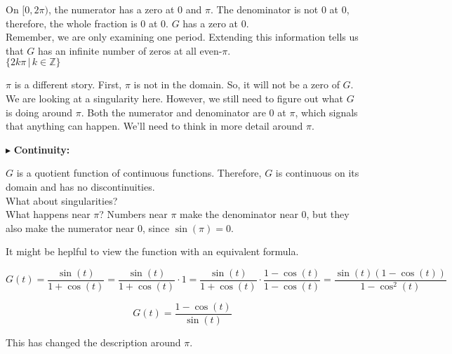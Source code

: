 \documentclass{ximera}
\begin{document}
On $[0, 2\pi)$, the numerator has a zero at $0$ and $\pi$.   The denominator is not $0$ at $0$, therefore, the whole fraction is $0$ at $0$.  $G$ has a zero at $0$. \\

Remember, we are only examining one period.  Extending this information tells us that $G$ has an infinite number of zeros at all even-$\pi$. \\



$\{  2k \pi \, | \, k \in \mathbb{Z}   \}$





$\pi$ is a different story.  First, $\pi$ is not in the domain. So, it will not be a zero of $G$. \\


We are looking at a singularity here. However, we still need to figure out what $G$ is doing around $\pi$. Both the numerator and denominator are $0$ at $\pi$, which signals that anything can happen.  We'll need to think in more detail around $\pi$.










$\blacktriangleright$ \textbf{\textcolor{blue!55!black}{Continuity: }}  


$G$ is a quotient function of continuous functions.  Therefore, $G$ is continuous on its domain and has no discontinuities. \\

What about singularities? \\






What happens near $\pi$?  Numbers near $\pi$ make the denominator near $0$, but they also make the numerator near $0$, since $\sin(\pi)=0$.

It might be heplful to view the function with an equivalent formula.


\[   G(t) = \frac{\sin(t)}{1 + \cos(t)}  = \frac{\sin(t)}{1 + \cos(t)}  \cdot 1 = \frac{\sin(t)}{1 + \cos(t)}  \cdot \frac{1-\cos(t)}{1-\cos(t)} = \frac{\sin(t) (1-\cos(t))}{1-\cos^2(t)}    \]



\[    G(t) = \frac{1-\cos(t)}{\sin(t)}  \]



This has changed the description around $\pi$. \\
\end{document}
